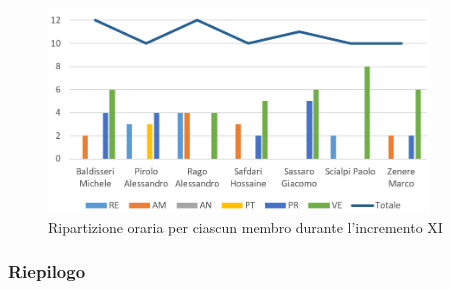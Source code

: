 \begin{figure}[!htb]   
    \centering
    \includegraphics[width=0.9\textwidth]{Images/incVC2}
	\caption{Ripartizione oraria per ciascun membro durante l'incremento XI}
\end{figure}

\subsubsection{Riepilogo}


